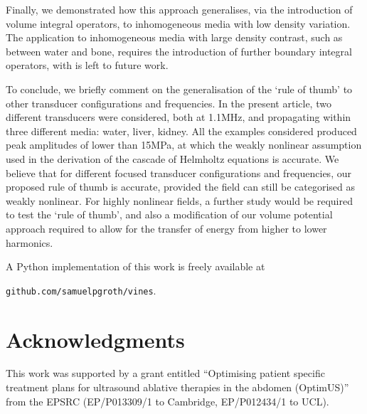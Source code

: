 \documentclass[11pt]{article}
\numberwithin{equation}{section}
\newcommand{\red}[1]{{\color{black} #1}}
\begin{document}
\red{Finally, we demonstrated how this approach generalises, via the introduction of volume integral operators,
 to inhomogeneous media with low density variation.
The application to inhomogeneous media with large density contrast, such as between 
water and bone, requires the introduction of further boundary integral operators, 
with is left to future work.}

\red{To conclude, we briefly comment on the generalisation of the `rule of thumb'
to other transducer configurations and frequencies. In the present article, two 
different transducers were considered, both at 1.1MHz, and propagating within 
three different media: water, liver, kidney. All the examples considered produced 
peak amplitudes of lower than 15MPa, at which the weakly nonlinear assumption used 
in the derivation of the cascade of Helmholtz equations is accurate. We believe that 
for different focused transducer configurations and frequencies, our proposed rule 
of thumb is accurate, provided the field can still be categorised as weakly nonlinear.
For highly nonlinear fields, a further study would be required to test the `rule of 
thumb', and also a modification of our volume potential approach required to allow for 
the transfer of energy from higher to lower harmonics.}


A Python implementation of this work is freely available at 
\begin{center}
    \verb!github.com/samuelpgroth/vines!.
\end{center}



\section*{Acknowledgments}
This work was supported by a grant entitled 
``Optimising patient specific treatment plans for ultrasound ablative therapies in the abdomen (OptimUS)''
from the EPSRC (EP/P013309/1 to Cambridge, EP/P012434/1 to UCL).


 

\end{document}
